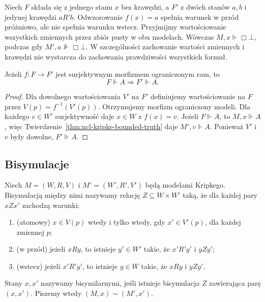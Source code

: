 \begin{przyklad}
\label{ex:ncl-kripke-forward-insufficient}
Niech $F$ składa się z jednego stanu $x$
bez krawędzi, a $F'$ z dwóch stanów $a,b$
i jedynej krawędzi $aR'b$. Odwzorowanie
$f(x)=a$ spełnia warunek w przód próżniowo,
ale nie spełnia warunku wstecz.
Przyjmijmy wartościowanie wszystkich zmiennych
przez zbiór pusty w obu modelach.
Wówczas $M,x\Vdash\Box\bot$, podczas gdy
$M',a\not\Vdash\Box\bot$. W szczególności
zachowanie wartości zmiennych i krawędzi
nie wystarcza do zachowania prawdziwości
wszystkich formuł.
\end{przyklad}

\begin{wniosek}
\label{cor:ncl-kripke-bounded-validity}
Jeżeli $f:F\to F'$ jest surjektywnym
morfizmem ograniczonym ram, to
\[
 F\Vdash A\Longrightarrow F'\Vdash A.
\]
\end{wniosek}
\begin{proof}
Dla dowolnego wartościowania $V'$ na $F'$
definiujemy wartościowanie na $F$ przez
$V(p)=f^{-1}(V'(p))$. Otrzymujemy morfizm
ograniczony modeli.
Dla każdego $v\in W'$ surjektywność daje
$x\in W$ z $f(x)=v$. Jeżeli $F\Vdash A$,
to $M,x\Vdash A$, więc
Twierdzenie~\ref{thm:ncl-kripke-bounded-truth}
daje $M',v\Vdash A$. Ponieważ $V'$ i $v$
były dowolne, $F'\Vdash A$.
\end{proof}

\subsection{Bisymulacje}

\begin{definicja}[Bisymulacja]
\label{def:ncl-kripke-bisimulation}
Niech $M=(W,R,V)$ i $M'=(W',R',V')$
będą modelami Kripkego.
Bisymulacją między nimi nazywamy relację
$Z\subseteq W\times W'$ taką, że dla każdej
pary $xZx'$ zachodzą warunki:
\begin{enumerate}
 \item (atomowy) $x\in V(p)$ wtedy i tylko wtedy,
 gdy $x'\in V'(p)$, dla każdej zmiennej $p$;
 \item (w przód) jeżeli $xRy$, to istnieje
 $y'\in W'$ takie, że $x'R'y'$ i $yZy'$;
 \item (wstecz) jeżeli $x'R'y'$, to istnieje
 $y\in W$ takie, że $xRy$ i $yZy'$.
\end{enumerate}
Stany $x,x'$ nazywamy bisymilarnymi, jeśli
istnieje bisymulacja $Z$ zawierająca parę
$(x,x')$. Piszemy wtedy $(M,x)\sim(M',x')$.
\end{definicja}

